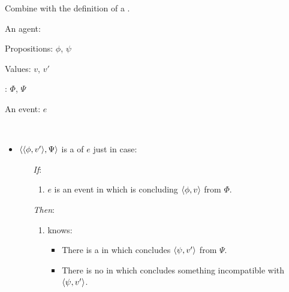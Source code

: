 \begin{note}
  Combine with the definition of a \fc{}.

    \begin{definition}[A \requ{0}]
    \label{def:requ}
    \begin{itemize*}[noitemsep, label=\(\circ\)]
    \item
      An agent: \vAgent{}
    \item
      Propositions: \(\phi\), \(\psi\)
    \item
      Values: \(v\), \(v'\)
    \item
      : \(\Phi\), \(\Psi\)
    \item
      An event: \(e\)
    \item
      \mbox{ }
    \end{itemize*}

    \begin{itemize}
    \item
      \(\langle \langle \phi, v' \rangle, \Psi \rangle\) is a \emph{\requ{}} of \(e\) just in case:
      \begin{itemize}
      \item[\emph{If}:]
        \begin{enumerate}[label=\alph*., ref=(\alph*), series=requDefSeries]
        \item
          \(e\) is an event in which \vAgent{} is concluding \(\langle \phi, v \rangle\) from \(\Phi\).
        \end{enumerate}
      \item[\emph{Then}:]
        \begin{enumerate}[label=\alph*., ref=(\alph*), resume*=requDefSeries]
        \item
          \vAgent{} knows:
          \begin{itemize}
          \item
            There is a \pevent{} in which \vAgent{} concludes \(\langle \psi, v' \rangle\) from \(\Psi\).
          \item
            There is no \pevent{} in which \vAgent{} concludes something incompatible with \(\langle \psi, v' \rangle\).
          \end{itemize}
        \end{enumerate}
      \end{itemize}
    \end{itemize}
    \vspace{-\baselineskip}
  \end{definition}
\end{note}

